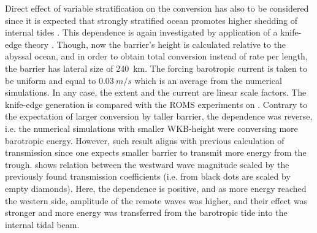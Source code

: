 \documentclass[12pt]{article}
\begin{document}
Direct effect of variable stratification on the conversion has also to be considered since it is 
expected that strongly stratified ocean promotes higher shedding of internal tides 
\citep{holloway1999internal}. This dependence is again investigated by application of a knife-edge 
theory 
\citep{st2003generation}. Though, now the barrier's height is calculated relative to the abyssal 
ocean, and in order to obtain total conversion instead of rate per length, the barrier has lateral 
size of 240~km. The forcing barotropic current is taken to be uniform and equal to $0.03~m/s$ 
which is 
an average from the numerical simulations. In any case, the extent and the current are linear 
scale factors. The knife-edge generation is compared with the ROMS experiments on  
. Contrary to the expectation of larger conversion by taller 
barrier, the dependence was reverse, i.e. the numerical simulations with smaller WKB-height were 
conversing more barotropic energy. However, such result aligns with previous calculation of 
transmission since one expects smaller barrier to transmit more energy from the trough. 
 shows 
relation between the westward wave magnitude scaled by the previously found transmission 
coefficients (i.e. from  black dots are scaled by empty diamonds). 
Here, the dependence is positive, and as more energy reached the western side, amplitude of the 
remote waves was higher, and their effect was stronger and more energy was transferred from the 
barotropic tide into the internal tidal beam.\\
\end{document}
